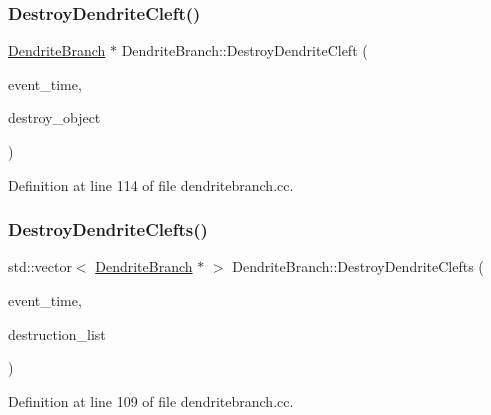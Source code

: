 \subsubsection{\texorpdfstring{Destroy\+Dendrite\+Cleft()}{DestroyDendriteCleft()}}
{\footnotesize\ttfamily \mbox{\hyperlink{class_dendrite_branch}{Dendrite\+Branch}} $\ast$ Dendrite\+Branch\+::\+Destroy\+Dendrite\+Cleft (\begin{DoxyParamCaption}\item[{std\+::chrono\+::time\+\_\+point$<$ \mbox{\hyperlink{universe_8h_a0ef8d951d1ca5ab3cfaf7ab4c7a6fd80}{Clock}} $>$}]{event\+\_\+time,  }\item[{\mbox{\hyperlink{class_dendrite_branch}{Dendrite\+Branch}} $\ast$}]{destroy\+\_\+object }\end{DoxyParamCaption})}



Definition at line 114 of file dendritebranch.\+cc.

\mbox{\label{class_dendrite_branch_a454dd0483439353076df63fc124a24f7}} 
\subsubsection{\texorpdfstring{Destroy\+Dendrite\+Clefts()}{DestroyDendriteClefts()}}
{\footnotesize\ttfamily std\+::vector$<$ \mbox{\hyperlink{class_dendrite_branch}{Dendrite\+Branch}} $\ast$ $>$ Dendrite\+Branch\+::\+Destroy\+Dendrite\+Clefts (\begin{DoxyParamCaption}\item[{std\+::chrono\+::time\+\_\+point$<$ \mbox{\hyperlink{universe_8h_a0ef8d951d1ca5ab3cfaf7ab4c7a6fd80}{Clock}} $>$}]{event\+\_\+time,  }\item[{std\+::vector$<$ \mbox{\hyperlink{class_dendrite_branch}{Dendrite\+Branch}} $\ast$$>$}]{destruction\+\_\+list }\end{DoxyParamCaption})}



Definition at line 109 of file dendritebranch.\+cc.

\mbox{\label{class_dendrite_branch_a4d4a4b1591dd612eef903d95605d50fd}} 
